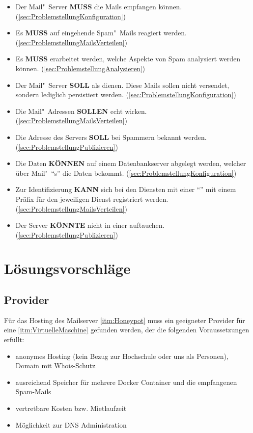\documentclass[a4paper,11pt,singlespacing]{article}
\begin{document}
	\begin{itemize}
	\item
		Der Mail"~Server \textbf{MUSS} die Mails empfangen können.
		(\ref{sec:ProblemstellungKonfiguration})
	\item
		Es \textbf{MUSS} auf eingehende Spam"~Mails reagiert werden.
		(\ref{sec:ProblemstellungMailsVerteilen})
	\item
		Es \textbf{MUSS} erarbeitet werden, welche Aspekte von Spam analysiert werden können.
		(\ref{sec:ProblemstellungAnalysieren})
	\item
		Der Mail"~Server \textbf{SOLL} als  dienen.
		Diese Mails sollen nicht versendet, sondern lediglich persistiert werden.
		(\ref{sec:ProblemstellungKonfiguration})
	\item
		Die Mail"~Adressen \textbf{SOLLEN} echt wirken.
		(\ref{sec:ProblemstellungMailsVerteilen})
	\item
		Die Adresse des  Servers \textbf{SOLL} bei Spammern bekannt werden.
		(\ref{sec:ProblemstellungPublizieren})
	\item
		Die Daten \textbf{KÖNNEN} auf einem Datenbankserver abgelegt werden, welcher über Mail"~"`s"' die Daten bekommt.
		(\ref{sec:ProblemstellungKonfiguration})
	\item
		Zur Identifizierung \textbf{KANN} sich bei den Diensten mit einer "`"' mit einem Präfix für den jeweiligen Dienst registriert werden.
		(\ref{sec:ProblemstellungMailsVerteilen})
	\item
		Der Server \textbf{KÖNNTE} nicht in einer   auftauchen.
		(\ref{sec:ProblemstellungPublizieren})
	\end{itemize}


\section{Lösungsvorschläge}\label{sec:Lösungsvorschläge}
	\subsection{Provider}\label{sec:Provider}
		Für das Hosting des Mailserver \autoref{itm:Honeypot} muss ein geeigneter Provider für eine \autoref{itm:VirtuelleMaschine} gefunden werden, der die folgenden Voraussetzungen erfüllt:
		\begin{itemize}
		    \item anonymes Hosting (kein Bezug zur Hochschule oder uns als Personen), Domain mit Whois-Schutz
			\item ausreichend Speicher für mehrere Docker Container und die empfangenen Spam-Mails
			\item vertretbare Kosten bzw. Mietlaufzeit
			\item Möglichkeit zur DNS Administration
		\end{itemize}
		
\end{document}
